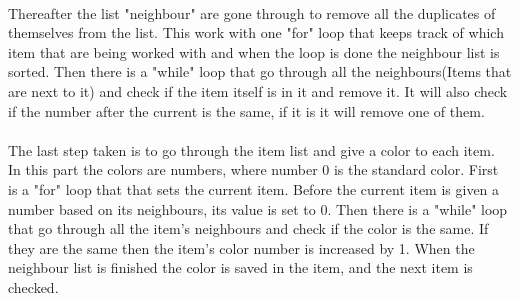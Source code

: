 \\
Thereafter the list "neighbour" are gone through to remove all the duplicates of themselves from the list. This work with one "for" loop that keeps track of which item that are being worked with and when the loop is done the neighbour list is sorted. Then there is a "while" loop that go through all the neighbours(Items that are next to it) and check if the item itself is in it and remove it. It will also check if the number after the current is the same, if it is it will remove one of them.\\
\\
The last step taken is to go through the item list and give a color to each item. In this part the colors are numbers, where number 0 is the standard color. First is a "for" loop that that sets the current item. Before the current item is given a number based on its neighbours, its value is set to 0. Then there is a "while" loop that go through all the item's neighbours and check if the color is the same. If they are the same then the item's color number is increased by 1. When the neighbour list is finished the color is saved in the item, and the next item is checked.